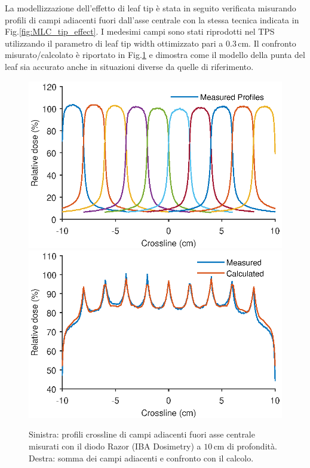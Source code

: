 La modellizzazione dell'effetto di leaf tip è stata in seguito verificata misurando profili di campi adiacenti fuori dall'asse centrale con la stessa tecnica indicata in Fig.\ref{fig:MLC_tip_effect}. I medesimi campi sono stati riprodotti nel TPS utilizzando il parametro di leaf tip width ottimizzato pari a $0.3\,$cm. Il confronto misurato/calcolato è riportato in Fig.\ref{fig:MLC_tip_model_offaxis} e dimostra come il modello della punta del leaf sia accurato anche in situazioni diverse da quelle di riferimento.
\begin{figure}[!t]
\centering
\includegraphics[width=.49\textwidth]{./cap2/MLC_Plots/Abutted/PlotMLC_Tip_modeling_offaxis.eps}
\includegraphics[width=.49\textwidth]{./cap2/MLC_Plots/Abutted/PlotMLC_Tip_modeling_offaxisSUM.eps}
\caption{Sinistra: profili crossline di campi adiacenti fuori asse centrale misurati con il diodo Razor (IBA Dosimetry) a $10\,$cm di profondità. Destra: somma dei campi adiacenti e confronto con il calcolo.}
\label{fig:MLC_tip_model_offaxis}
\end{figure}


